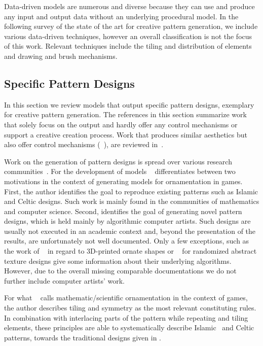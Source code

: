 Data-driven models are numerous and diverse because they can use and produce any input and output data without an underlying procedural model. In the following survey of the state of the art for creative pattern generation, we include various data-driven techniques, however an overall classification is not the focus of this work. Relevant techniques include the tiling and distribution of elements and drawing and brush mechanisms.


\subsection{Specific Pattern Designs}
\label{subsec:specific_pattern_designs}

In this section we review models that output specific pattern designs, exemplary for creative pattern generation. The references in this section summarize work that solely focus on the output and hardly offer any control mechanisms or support a creative creation process. Work that produces similar aesthetics but also offer control mechanisms (\eg~\cite{wong_1998_cgf,yu_2012_ans,zehnder_2016_dso}), are reviewed in~.


Work on the generation of pattern designs is spread over various research communities~\cite{whitehead_2010_tpd}. For the development of models \citeauthor*{whitehead_2010_tpd}~\cite{whitehead_2010_tpd} differentiates between two motivations in the context of generating models for ornamentation in games. First, the author identifies the goal to reproduce existing patterns such as Islamic and Celtic designs. Such work is mainly found in the communities of mathematics and computer science. Second, \citeauthor*{whitehead_2010_tpd} identifies the goal of generating novel pattern designs, which is held mainly by algorithmic computer artists. Such designs are usually not executed in an academic context and, beyond the presentation of the results, are unfortunately not well documented. Only a few exceptions, such as the work of \citeauthor*{takayama_2016_med}~\cite{takayama_2016_med} in regard to 3D-printed ornate shapes or \citeauthor*{alvarez_2019_ido}~\cite{alvarez_2019_ido} for randomized abstract texture designs give some information about their underlying algorithms. However, due to the overall missing comparable documentations we do not further include computer artists' work.

For what \citeauthor*{whitehead_2010_tpd}~\cite{whitehead_2010_tpd} calls mathematic/scientific ornamentation in the context of games, the author describes tiling and symmetry as the most relevant constituting rules. In combination with interlacing parts of the pattern while repeating and tiling elements, these principles are able to systematically describe Islamic~\cite{ostromoukhov_1998_mtc} and Celtic~\cite{cromwell_1993_ckm} patterns, towards the traditional designs given in .


